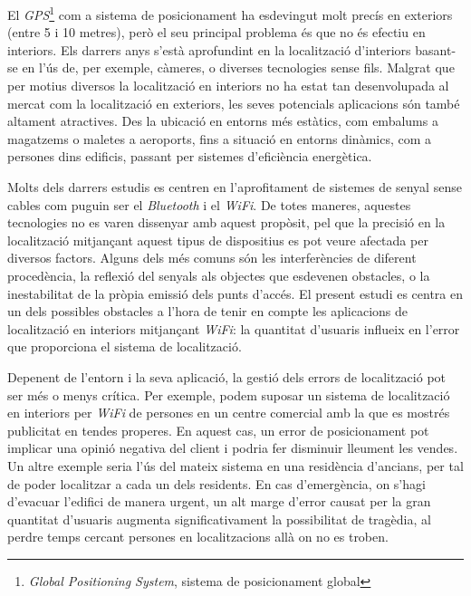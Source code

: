 
El \textit{GPS}\footnote{\textit{Global Positioning System}, sistema de posicionament global} com a sistema de posicionament ha esdevingut molt precís en exteriors (entre 5 i 10 metres\cite{pogge}), però el seu principal problema és que no és efectiu en interiors. Els darrers anys s’està aprofundint en la localització d’interiors basant-se en l’ús de, per exemple, càmeres, o diverses tecnologies sense fils. Malgrat que per motius diversos la localització en interiors no ha estat tan desenvolupada al mercat com la localització en exteriors, les seves potencials aplicacions són també altament atractives. Des la ubicació en entorns més estàtics, com embalums a magatzems o maletes a aeroports, fins a situació en entorns dinàmics, com a persones dins edificis, passant per sistemes d'eficiència energètica.

Molts dels darrers estudis es centren en l’aprofitament de sistemes de senyal sense cables com puguin ser el \textit{Bluetooth}\cite{kotanen} i el \textit{WiFi}\cite{bagosi}\cite{evennou}\cite{garcia}. De totes maneres, aquestes tecnologies no es varen dissenyar amb aquest propòsit, pel que la precisió en la localització mitjançant aquest tipus de dispositius es pot veure afectada per diversos factors. Alguns dels més comuns són les interferències de diferent procedència, la reflexió del senyals als objectes que esdevenen obstacles, o la inestabilitat de la pròpia emissió dels punts d'accés. El present estudi es centra en un dels possibles obstacles a l'hora de tenir en compte les aplicacions de localització en interiors mitjançant \textit{WiFi}: la quantitat d'usuaris influeix en l’error que proporciona el sistema de localització.

Depenent de l’entorn i la seva aplicació, la gestió dels errors de localització pot ser més o menys crítica. Per exemple, podem suposar un sistema de localització en interiors per \textit{WiFi} de persones en un centre comercial amb la que es mostrés publicitat en tendes properes. En aquest cas, un error de posicionament pot implicar una opinió negativa del client i podria fer disminuir lleument les vendes. Un altre exemple seria l’ús del mateix sistema en una residència d’ancians, per tal de poder localitzar a cada un dels residents. En cas d’emergència, on s’hagi d’evacuar l’edifici de manera urgent, un alt marge d’error causat per la gran quantitat d'usuaris augmenta significativament la possibilitat de tragèdia, al perdre temps cercant persones en localitzacions allà on no es troben.

